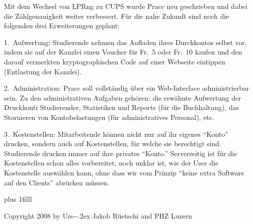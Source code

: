 Mit dem Wechsel von LPRng zu CUPS wurde Pracc neu geschrieben und
dabei die Z\"ahlgenauigkeit weiter verbessert. F\"ur die nahe
Zukunft sind noch die folgenden drei Erweiterungen geplant:

1.~Aufwertung: Studierende nehmen das Aufladen ihres Durckkontos selbst
vor, indem sie auf der Kanzlei einen Voucher f\"ur Fr.~5 oder Fr.~10
kaufen und den darauf vermerkten krypto\-graphi\-schen Code auf einer
Webseite eintippen (Entlastung der Kanzlei).

2.~Administration: Pracc soll vollst\"andig \"uber ein Web-Interface
administrierbar sein. Zu den administrativen Aufgaben geh\"oren: die
erw\"ahnte Aufwertung der Druckkonti Studierender, Statistiken und
Reports (f\"ur die Buchhaltung), das Stornieren von Kontobelastungen
(f\"ur administratives Personal), etc.

3.~Kostenstellen: Mitarbeitende k\"onnen nicht nur auf ihr eigenes ``Konto''
drucken, sondern auch auf Kostenstellen, f\"ur welche sie berechtigt sind.
Studierende drucken immer auf ihre privates ``Konto.''
Serverseitig ist f\"ur die Kostenstellen schon alles vorbereitet,
noch unklar ist, wie der User die Kostenstelle ausw\"ahlen kann,
ohne dass wir vom Prinzip ``keine extra Software auf den Clients''
abr\"ucken m\"ussen.


\vskip 1pc plus 1filll\nopagenumbers
\centerline{\smallrm
 Copyright 2008 by Urs-\kern-.2ex Jakob R\"uetschi and PHZ Luzern}
\bye
